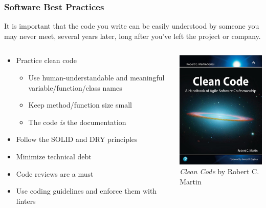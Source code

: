 \begin{frame}
\frametitle{Software Best Practices}
It is important that the code you write can be easily understood by someone
you may never meet, several years later, long after you've left the project
or company.

\begin{columns}[]
    \begin{column}{0.65\textwidth}
        \begin{itemize}
            \item Practice clean code
            \begin{itemize}
                \item Use human-understandable and meaningful variable/function/class
                    names
                \item Keep method/function size small
                \item The code \emph{is} the documentation
            \end{itemize}
            \item Follow the SOLID and DRY principles
            \item Minimize technical debt
            \item Code reviews are a must
            \item Use coding guidelines and enforce them with linters
        \end{itemize}   
    \end{column}
    \begin{column}{0.35\textwidth}
        \centering
        \includegraphics[height=0.75\textwidth]{images/book_clean_code.jpg}\\
        \footnotesize{\emph{Clean Code} by Robert C. Martin\footnotemark[1]}
    \end{column}
\end{columns}
\end{frame}

